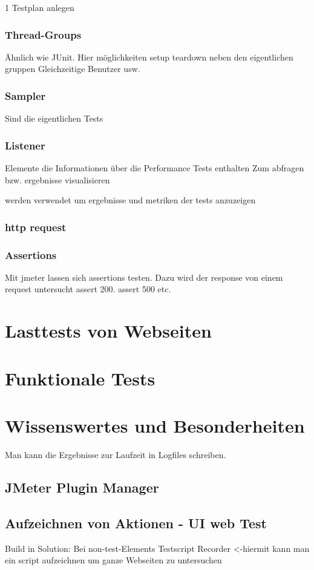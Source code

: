 \documentclass[a4paper,12pt]{article}
\begin{document}
1 Testplan anlegen
\subsubsection{Thread-Groups}
Ähnlich wie JUnit. Hier möglichkeiten setup teardown neben den eigentlichen gruppen
Gleichzeitige Benutzer usw.
\subsubsection{Sampler}
Sind die eigentlichen Tests
\subsubsection{Listener}
Elemente die Informationen über die Performance Tests enthalten
Zum abfragen bzw. ergebnisse visualisieren

werden verwendet um ergebnisse und metriken der tests anzuzeigen

\subsubsection{http request}
\subsubsection{Assertions}
Mit jmeter lassen sich assertions testen. Dazu wird der response von einem request untersucht assert 200. assert 500 etc.

\section{Lasttests von Webseiten}

\section{Funktionale Tests}

\section{Wissenswertes und Besonderheiten}
Man kann die Ergebnisse zur Laufzeit in Logfiles schreiben.

\subsection{JMeter Plugin Manager}



\subsection{Aufzeichnen von Aktionen - UI web Test}
Build in Solution:
Bei non-test-Elements Testscript Recorder <-hiermit kann man ein script aufzeichnen um ganze Webseiten zu untersuchen
\end{document}
